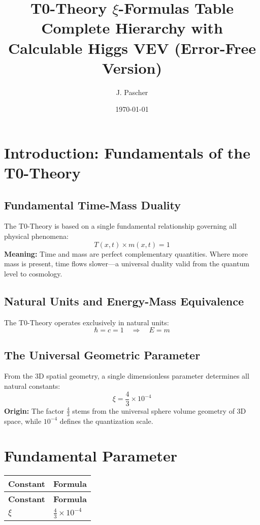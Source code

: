 \documentclass[12pt,a4paper]{article}
\begin{document}
	
	\title{\textbf{T0-Theory $\xi$-Formulas Table}\\[0.5cm]
		\large Complete Hierarchy with Calculable Higgs VEV (Error-Free Version)}
	\author{J. Pascher}
	\date{\today}
	
	\maketitle
	
	\section{Introduction: Fundamentals of the T0-Theory}
	
	\subsection{Fundamental Time-Mass Duality}
	The T0-Theory is based on a single fundamental relationship governing all physical phenomena:
	\begin{equation}
		\boxed{T(x,t) \times m(x,t) = 1}
	\end{equation}
	\textbf{Meaning:} Time and mass are perfect complementary quantities. Where more mass is present, time flows slower—a universal duality valid from the quantum level to cosmology.
	
	\subsection{Natural Units and Energy-Mass Equivalence}
	The T0-Theory operates exclusively in natural units:
	\begin{equation}
		\boxed{\hbar = c = 1 \quad \Rightarrow \quad E = m}
	\end{equation}
	
	\subsection{The Universal Geometric Parameter}
	From the 3D spatial geometry, a single dimensionless parameter determines all natural constants:
	\begin{equation}
		\boxed{\xi = \frac{4}{3} \times 10^{-4}}
	\end{equation}
	\textbf{Origin:} The factor $\frac{4}{3}$ stems from the universal sphere volume geometry of 3D space, while $10^{-4}$ defines the quantization scale.
	
	\section{Fundamental Parameter}
	\begin{longtable}{|p{5cm}|p{6cm}|}
		\hline
		\textbf{Constant} & \textbf{Formula} \\
		\hline
		\endfirsthead
		\hline
		\textbf{Constant} & \textbf{Formula} \\
		\hline
		\endhead
		$\xi$ & $\frac{4}{3} \times 10^{-4}$ \\
		\hline
	\end{longtable}
	
\end{document}

